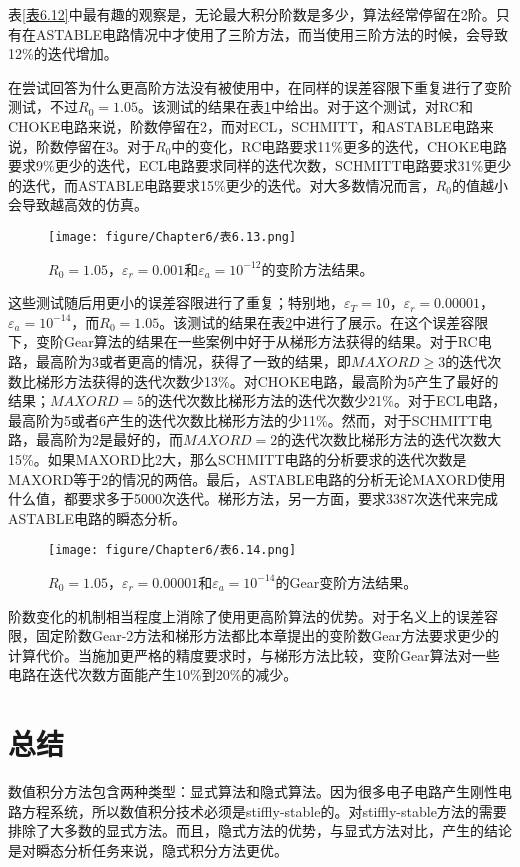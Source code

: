 表\ref{表6.12}中最有趣的观察是，无论最大积分阶数是多少，算法经常停留在2阶。只有在ASTABLE电路情况中才使用了三阶方法，而当使用三阶方法的时候，会导致12\%的迭代增加。

在尝试回答为什么更高阶方法没有被使用中，在同样的误差容限下重复进行了变阶测试，不过$R_0 = 1.05$。该测试的结果在表\ref{表6.13}中给出。对于这个测试，对RC和CHOKE电路来说，阶数停留在2，而对ECL，SCHMITT，和ASTABLE电路来说，阶数停留在3。对于$R_0$中的变化，RC电路要求11\%更多的迭代，CHOKE电路要求9\%更少的迭代，ECL电路要求同样的迭代次数，SCHMITT电路要求31\%更少的迭代，而ASTABLE电路要求15\%更少的迭代。对大多数情况而言，$R_0$的值越小会导致越高效的仿真。

\begin{figure}[htbp]
\small
    \centering
    \texttt{[image: figure/Chapter6/表6.13.png]}
    \caption{$R_0 = 1.05$，$\varepsilon_r = 0.001$和$\varepsilon_a = 10^{-12}$的变阶方法结果。}
    \label{表6.13}
\end{figure}

这些测试随后用更小的误差容限进行了重复；特别地，$\varepsilon_T=10$，$\varepsilon_r = 0.00001$，$\varepsilon_a = 10^{-14}$，而$R_0 = 1.05$。该测试的结果在表\ref{表6.14}中进行了展示。在这个误差容限下，变阶Gear算法的结果在一些案例中好于从梯形方法获得的结果。对于RC电路，最高阶为3或者更高的情况，获得了一致的结果，即$MAXORD \geq 3$的迭代次数比梯形方法获得的迭代次数少13\%。对CHOKE电路，最高阶为5产生了最好的结果；$MAXORD = 5$的迭代次数比梯形方法的迭代次数少21\%。对于ECL电路，最高阶为5或者6产生的迭代次数比梯形方法的少11\%。然而，对于SCHMITT电路，最高阶为2是最好的，而$MAXORD = 2$的迭代次数比梯形方法的迭代次数大15\%。如果MAXORD比2大，那么SCHMITT电路的分析要求的迭代次数是MAXORD等于2的情况的两倍。最后，ASTABLE电路的分析无论MAXORD使用什么值，都要求多于5000次迭代。梯形方法，另一方面，要求3387次迭代来完成ASTABLE电路的瞬态分析。

\begin{figure}[htbp]
\small
    \centering
    \texttt{[image: figure/Chapter6/表6.14.png]}
    \caption{$R_0 = 1.05$，$\varepsilon_r = 0.00001$和$\varepsilon_a = 10^{-14}$的Gear变阶方法结果。}
    \label{表6.14}
\end{figure}

阶数变化的机制相当程度上消除了使用更高阶算法的优势。对于名义上的误差容限，固定阶数Gear-2方法和梯形方法都比本章提出的变阶数Gear方法要求更少的计算代价。当施加更严格的精度要求时，与梯形方法比较，变阶Gear算法对一些电路在迭代次数方面能产生10\%到20\%的减少。

\section{总结}
数值积分方法包含两种类型：显式算法和隐式算法。因为很多电子电路产生刚性电路方程系统，所以数值积分技术必须是stiffly-stable的。对stiffly-stable方法的需要排除了大多数的显式方法。而且，隐式方法的优势，与显式方法对比，产生的结论是对瞬态分析任务来说，隐式积分方法更优。

